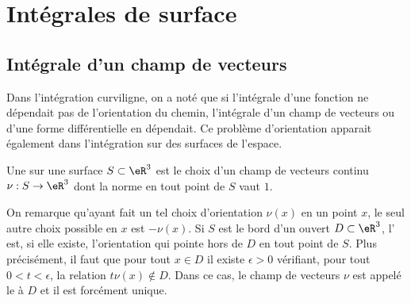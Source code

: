 \section{Intégrales de surface}
\label{secintsurfaciques}

\subsection{Intégrale d'un champ de vecteurs}
Dans l'intégration curviligne, on a noté que si l'intégrale d'une fonction ne dépendait pas de l'orientation du chemin, l'intégrale d'un champ de vecteurs ou d'une forme différentielle en dépendait. Ce problème d'orientation apparait également dans l'intégration sur des surfaces de l'espace.

\begin{definition}      \label{DEFooFTQLooXXbtOQ}
	Une  sur une surface \( S \subset \eR^3\) est le choix d'un champ de vecteurs continu \( \nu : S \to \eR^3\) dont la norme en tout point de \( S\) vaut \( 1\).
\end{definition}

On remarque qu'ayant fait un tel choix
d'orientation \( \nu(x)\) en un point \( x\), le seul autre choix possible
en \( x\) est \( -\nu(x)\).
Si \( S\) est le bord d'un ouvert \( D \subset \eR^3\), l' est, si elle existe, l'orientation qui
pointe hors de \( D\) en tout point de \( S\). Plus précisément, il faut que
pour tout \( x \in D\) il existe \( \epsilon > 0\) vérifiant, pour tout \( 0 <
t < \epsilon\), la relation \( t \nu(x) \notin D\). Dans ce cas, le champ
de vecteurs \( \nu\) est appelé le  à \( D\) et il est forcément unique.

